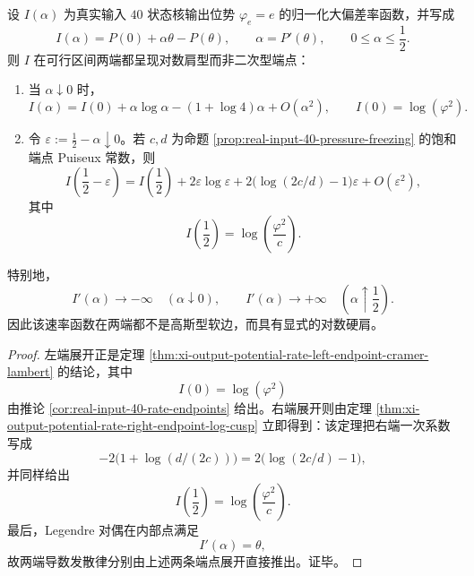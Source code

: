 \begin{theorem}[输出位势大偏差函数的双端点对数肩型]\label{thm:conclusion-realinput40-output-ldp-double-log-shoulder}
设 \(I(\alpha)\) 为真实输入 \(40\) 状态核输出位势 \(\varphi_e=e\) 的归一化大偏差率函数，并写成
\[
I(\alpha)=P(0)+\alpha\theta-P(\theta),
\qquad
\alpha=P'(\theta),
\qquad
0\le \alpha\le \frac12.
\]
则 \(I\) 在可行区间两端都呈现对数肩型而非二次型端点：
\begin{enumerate}
  \item 当 \(\alpha\downarrow 0\) 时，
  \[
  I(\alpha)
  =
  I(0)+\alpha\log\alpha-(1+\log 4)\alpha+O(\alpha^2),
  \qquad
  I(0)=\log(\varphi^2).
  \]
  \item 令 \(\varepsilon:=\frac12-\alpha\downarrow 0\)。若 \(c,d\) 为命题 \ref{prop:real-input-40-pressure-freezing} 的饱和端点 Puiseux 常数，则
  \[
  I\!\left(\frac12-\varepsilon\right)
  =
  I\!\left(\frac12\right)
  +2\varepsilon\log\varepsilon
  +2\bigl(\log(2c/d)-1\bigr)\varepsilon
  +O(\varepsilon^2),
  \]
  其中
  \[
  I\!\left(\frac12\right)=\log\!\left(\frac{\varphi^2}{c}\right).
  \]
\end{enumerate}
特别地，
\[
I'(\alpha)\to-\infty \quad (\alpha\downarrow 0),
\qquad
I'(\alpha)\to+\infty \quad \left(\alpha\uparrow \frac12\right).
\]
因此该速率函数在两端都不是高斯型软边，而具有显式的对数硬肩。
\end{theorem}
\begin{proof}
左端展开正是定理 \ref{thm:xi-output-potential-rate-left-endpoint-cramer-lambert} 的结论，其中
\[
I(0)=\log(\varphi^2)
\]
由推论 \ref{cor:real-input-40-rate-endpoints} 给出。右端展开则由定理 \ref{thm:xi-output-potential-rate-right-endpoint-log-cusp} 立即得到：该定理把右端一次系数写成
\[
-2\bigl(1+\log(d/(2c))\bigr)
=
2\bigl(\log(2c/d)-1\bigr),
\]
并同样给出
\[
I\!\left(\frac12\right)=\log\!\left(\frac{\varphi^2}{c}\right).
\]
最后，Legendre 对偶在内部点满足
\[
I'(\alpha)=\theta,
\]
故两端导数发散律分别由上述两条端点展开直接推出。证毕。
\end{proof}

